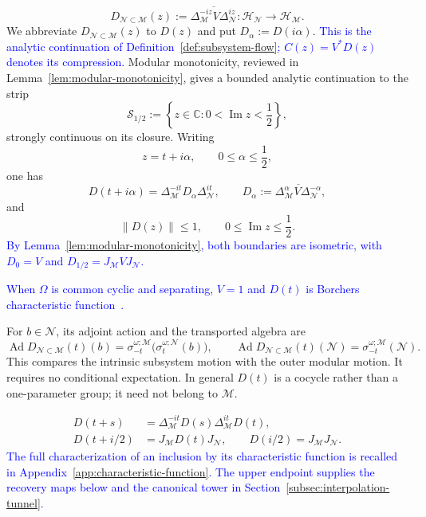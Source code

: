 \documentclass[a4paper,11pt]{article}
\theoremstyle{definition}
\newcommand{\nn}{\nonumber}
\newcommand{\mN}{\mathcal{N}}
\newcommand{\mH}{\mathcal{H}}
\newcommand{\mM}{\mathcal{M}}
\newcommand{\NL}[1]{\textcolor{blue}{#1}}
\begin{document}
\begin{equation}
    D_{\mN\subset\mM}(z)
    :=
    \overline{
    \Delta_{\mM}^{-iz}V\Delta_{\mN}^{iz}}
    :
    \mH_{\mN}\longrightarrow\mH_{\mM} .
    \label{eq:Wz-definition}
\end{equation}
We abbreviate $D_{\mN\subset\mM}(z)$ to $D(z)$ and put
$D_\alpha:=D(i\alpha)$. \NL{This is the analytic continuation of Definition~\ref{def:subsystem-flow}; $C(z)=V^*D(z)$ denotes its compression.} Modular monotonicity, reviewed in
Lemma~\ref{lem:modular-monotonicity}, gives a bounded analytic continuation
to the strip
\begin{equation}
    \mathcal S_{1/2}
    :=
    \left\{
    z\in\mathbb C:
    0<\operatorname{Im}z<\frac12
    \right\},
\end{equation}
strongly continuous on its closure. Writing
\begin{equation}
    z=t+i\alpha,
    \qquad
    0\leq\alpha\leq\frac12 ,
\end{equation}
one has
\begin{equation}
    D(t+i\alpha)
    =
    \Delta_{\mM}^{-it}
    D_\alpha
    \Delta_{\mN}^{it},
    \qquad
    D_\alpha
    :=
    \overline{
    \Delta_{\mM}^\alpha V\Delta_{\mN}^{-\alpha}},
    \label{eq:W-alpha-strip}
\end{equation}
and
\begin{equation}
    \boxed{
    \|D(z)\|\leq1,
    \qquad
    0\leq\operatorname{Im}z\leq\frac12 .
    }
    \label{eq:W-strip-bound}
\end{equation}
\NL{By Lemma~\ref{lem:modular-monotonicity}, both boundaries are isometric, with $D_0=V$ and $D_{1/2}=J_{\mM}VJ_{\mN}$.}


\NL{When $\Omega$ is common cyclic and separating, $V=1$ and $D(t)$ is Borchers\textquotesingle{} characteristic function~\cite{revolutionizing}.}

For $b\in\mN$, its adjoint action and the transported algebra are
\begin{equation}\label{eq:characteristic-algebra-transport}
 \operatorname{Ad}D_{\mN\subset\mM}(t)(b)=\sigma^{\omega;\mM}_{-t}\bigl(\sigma^{\omega;\mN}_t(b)\bigr),
 \qquad \operatorname{Ad}D_{\mN\subset\mM}(t)(\mN)=\sigma^{\omega;\mM}_{-t}(\mN).
\end{equation}
This compares the intrinsic subsystem motion with the outer modular motion.
It requires no conditional expectation. In general $D(t)$ is a cocycle rather than
a one-parameter group; it need not belong to $\mM$.

\begingroup\color{blue}
\begin{align}
 D(t+s)&=\Delta_{\mM}^{-it}D(s)\Delta_{\mM}^{it}D(t),\nn\\
 D(t+i/2)&=J_{\mM}D(t)J_{\mN},\qquad D(i/2)=J_{\mM}J_{\mN}.
 \label{eq:subsystem-flow-boundary}
\end{align}
\endgroup
\NL{The full characterization of an inclusion by its characteristic function is recalled in Appendix~\ref{app:characteristic-function}. The upper endpoint supplies the recovery maps below and the canonical tower in Section~\ref{subsec:interpolation-tunnel}.}
\end{document}
